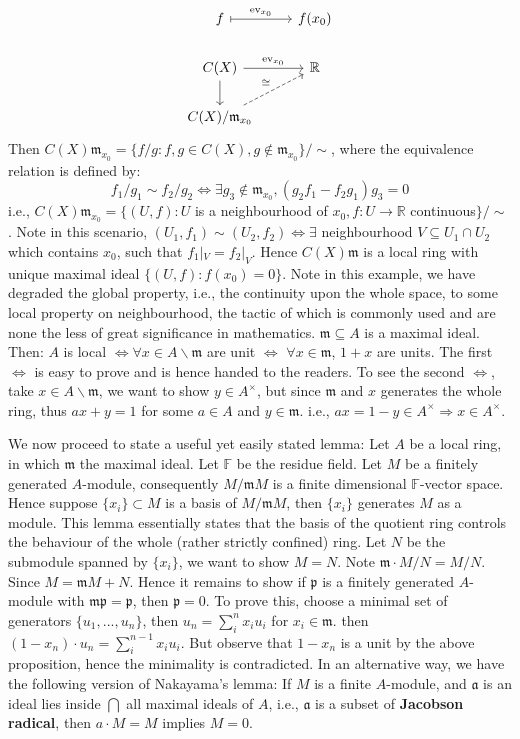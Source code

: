 \documentclass[12pt]{article}
\theoremstyle{definition}
\theoremstyle{plain}
\DeclareMathOperator{\ev}{ev}
\newcommand{\real}{\mathbb{R}}
\newcommand{\field}{\mathbb{F}}
\begin{document}
\begin{equation}
  \begin{tikzcd}
    f\ar[|->]{r}{\ev_{x_0}}&f(x_0)\\
    C(X) \ar{r}{\ev_{x_0}} \ar{d}& \real\\
    C(X)/\mathfrak{m}_{x_0}\ar[dashed]{ru}{\cong}
  \end{tikzcd}
\end{equation}
Then $C(X)\mathfrak{m}_{x_0}=\{f/g: f, g\in C(X), g\notin \mathfrak{m}_{x_0}\}/\sim$, where the equivalence relation is defined by:
$$f_1/g_1\sim f_2/g_2 \iff \exists g_3\notin \mathfrak{m}_{x_0}, (g_2f_1-f_2g_1)g_3=0$$
i.e., $C(X)\mathfrak{m}_{x_0}=\{(U, f): U$ is a neighbourhood of $x_0, f: U\to \real$ continuous$\}/\sim$. Note in this scenario, $(U_1, f_1)\sim(U_2, f_2) \iff \exists$ neighbourhood $V\subseteq U_1\cap U_2$ which contains $x_0$, such that $f_1|_V=f_2|_V$.
Hence $C(X)\mathfrak{m}$ is a local ring with unique maximal ideal $\{(U, f): f(x_0)=0\}$.
\Rmk Note in this example, we have degraded the global property, i.e., the continuity upon the whole space, to some local property on neighbourhood, the tactic of which is commonly used and are none the less of great significance in mathematics.
\Lemma $\mathfrak{m}\subseteq A$ is a maximal ideal. Then: $A$ is local $\iff \forall x\in A\backslash \mathfrak{m}$ are unit $\iff$ $\forall x\in \mathfrak{m}$, $1+x$ are units.
\proof The first $\iff$ is easy to prove and is hence handed to the readers. To see the second $\iff$, take $x\in A\backslash \mathfrak{m}$, we want to show $y\in A^\times$, but since $\mathfrak{m}$ and $x$ generates the whole ring, thus $ax+y=1$ for some $a\in A$ and $y\in \mathfrak{m}$. i.e., $ax=1-y\in A^\times \Rightarrow x\in A^\times$.

\medskip
We now proceed to state a useful yet easily stated lemma:
 Let $A$ be a local ring, in which $\mathfrak{m}$ the maximal ideal. Let $\field$ be the residue field. Let $M$ be a finitely generated $A$-module, consequently $M/\mathfrak{m}M$ is a finite dimensional $\field$-vector space. Hence suppose $\{x_i\}\subset M$ is a basis of $M/\mathfrak{m}M$, then $\{x_i\}$ generates $M$ as a module.
\Rmk This lemma essentially states that the basis of the quotient ring controls the behaviour of the whole (rather strictly confined) ring.
\proof Let $N$ be the submodule spanned by $\{x_i\}$, we want to show $M=N$. Note $\mathfrak{m}\cdot M/N=M/N$. Since $M=\mathfrak{m}M+N$. Hence it remains to show if $\mathfrak{p}$ is a finitely generated $A$-module with $\mathfrak{m}\mathfrak{p}=\mathfrak{p}$, then $\mathfrak{p}=0$. To prove this, choose a minimal set of generators $\{u_1, ..., u_n\}$, then $u_n=\sum_i^n x_iu_i$ for $x_i\in \mathfrak{m}$. then $(1-x_n)\cdot u_n=\sum_i^{n-1}x_iu_i$. But observe that $1-x_n$ is a unit by the above proposition, hence the minimality is contradicted.
\Rmk In an alternative way, we have the following version of Nakayama's lemma:
 If $M$ is a finite $A$-module, and $\mathfrak{a}$ is an ideal lies inside $\bigcap$ all maximal ideals of $A$, i.e., $\mathfrak{a}$ is a subset of \textbf{Jacobson radical}, then $a\cdot M=M$ implies $M=0$.
\end{document}
